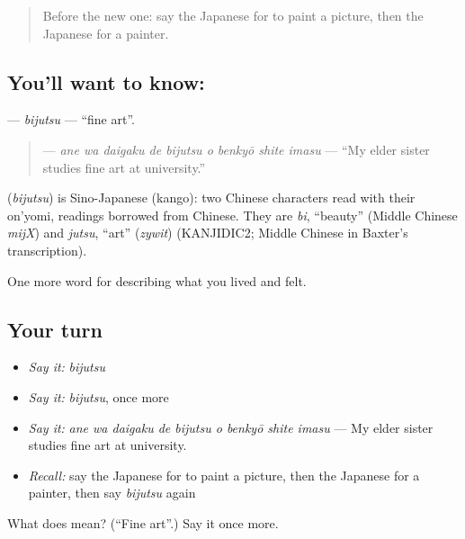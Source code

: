 \label{lesson:JA-C465-bijutsu}



\begin{quote}
Before the new one: say the Japanese for to paint a picture, then the Japanese for a painter.
\end{quote}

\subsection*{You'll want to know: }
\textbf{} — \emph{bijutsu} — \textquotedblleft{}fine art\textquotedblright{}.

\begin{quote}
\textbf{   } — \emph{ane wa daigaku de bijutsu o benkyō shite imasu} — \textquotedblleft{}My elder sister studies fine art at university.\textquotedblright{}
\end{quote}

\begin{cousinweb}
\textbf{} (\emph{bijutsu}) is Sino-Japanese (kango): two Chinese characters read with their on'yomi, readings borrowed from Chinese. They are \emph{bi}, \textquotedblleft{}beauty\textquotedblright{} (Middle Chinese \emph{mijX}) and \emph{jutsu}, \textquotedblleft{}art\textquotedblright{} (\emph{zywit}) (KANJIDIC2; Middle Chinese in Baxter's transcription).
\end{cousinweb}

\begin{grammarlens}[title={What you've built}]
One more word for describing what you lived and felt.
\end{grammarlens}

\subsection*{Your turn}
\begin{itemize}
\raggedright
  \item \emph{Say it:} \emph{bijutsu}
  \item \emph{Say it:} \emph{bijutsu}, once more
  \item \emph{Say it:} \emph{ane wa daigaku de bijutsu o benkyō shite imasu} — My elder sister studies fine art at university.
  \item \emph{Recall:} say the Japanese for to paint a picture, then the Japanese for a painter, then say \emph{bijutsu} again
\end{itemize}

\begin{tcolorbox}[breakable,colback=teal!4,colframe=teal!35!black,title={Before you move on}]
What does  mean? (\textquotedblleft{}Fine art\textquotedblright{}.) Say it once more.
\end{tcolorbox}
